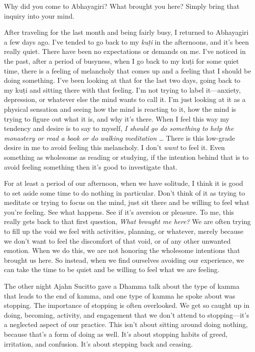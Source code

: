 
Why did you come to Abhayagiri? What brought you here? Simply bring 
that inquiry into your mind.

After traveling for the last month and being fairly busy, I returned to 
Abhayagiri a few days ago. I've tended to go back to my \emph{kuṭi} 
in the afternoons, and it's been really quiet. There have been no 
expectations or demands on me. I've noticed in the past, after a period 
of busyness, when I go back to my kuṭi for some quiet time, there is 
a feeling of melancholy that comes up and a feeling that I should be 
doing something. I've been looking at that for the last two days, going 
back to my kuṭi and sitting there with that feeling. I'm not trying 
to label it---anxiety, depression, or whatever else the mind wants to 
call it. I'm just looking at it as a physical sensation and seeing how 
the mind is reacting to it, how the mind is trying to figure out what 
it is, and why it's there. When I feel this way my tendency and desire 
is to say to myself, \emph{I should go do something to help the 
monastery or read a book or do walking meditation \ldots{}} There is 
this low-grade desire in me to avoid feeling this melancholy. I don't 
\emph{want} to feel it. Even something as wholesome as reading or 
studying, if the intention behind that is to avoid feeling something 
then it's good to investigate that.

For at least a period of our afternoon, when we have solitude, I think 
it is good to set aside some time to do nothing in particular. Don't 
think of it as trying to meditate or trying to focus on the mind, just 
sit there and be willing to feel what you're feeling. See what happens. 
See if it's aversion or pleasure. To me, this really gets back to that 
first question, \emph{What brought me here?} We are often trying to 
fill up the void we feel with activities, planning, or whatever, merely 
because we don't want to feel the discomfort of that void, or of any 
other unwanted emotion. When we do this, we are not honoring the 
wholesome intentions that brought us here. So instead, when we find 
ourselves avoiding our experience, we can take the time to be quiet and 
be willing to feel what we are feeling.


The other night Ajahn Sucitto gave a Dhamma talk about the type of 
kamma that leads to the end of kamma, and one type of kamma he spoke 
about was stopping. The importance of stopping is often overlooked. We 
get so caught up in doing, becoming, activity, and engagement that we 
don't attend to stopping---it's a neglected aspect of our practice. 
This isn't about sitting around doing nothing, because that's a form of 
doing as well. It's about stopping habits of greed, irritation, and 
confusion. It's about stepping back and ceasing.

